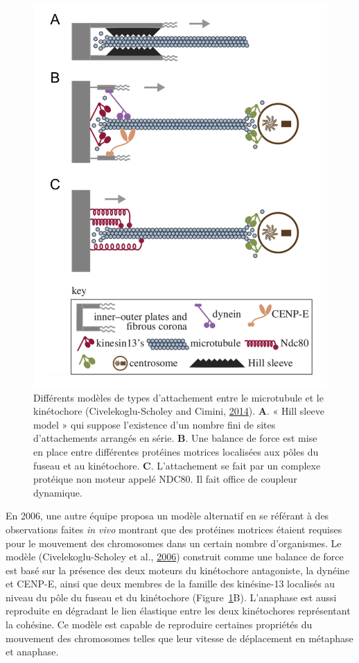 \documentclass[12pt,a4paper,twoside,openright]{book}
\begin{document}
\begin{figure}[htbp]
\centering
\includegraphics{figures/intro/hill_model.png}
\caption[Différents modèles de types d'attachement entre le microtubule et le kinétochore]{\label{fig:hill_model}Différents
modèles de types d'attachement entre le microtubule et le kinétochore
(Civelekoglu-Scholey and Cimini,
\hyperref[ref-Civelekoglu-Scholey2014]{2014}). \textbf{A}. « Hill sleeve
model » qui suppose l'existence d'un nombre fini de sites d'attachements
arrangés en série. \textbf{B}. Une balance de force est mise en place
entre différentes protéines motrices localisées aux pôles du fuseau et
au kinétochore. \textbf{C}. L'attachement se fait par un complexe
protéique non moteur appelé NDC80. Il fait office de coupleur
dynamique.}
\end{figure}

En 2006, une autre équipe proposa un modèle alternatif en se référant à
des observations faites \emph{in vivo} montrant que des protéines
motrices étaient requises pour le mouvement des chromosomes dans un
certain nombre d'organismes. Le modèle (Civelekoglu-Scholey et al.,
\hyperref[ref-Civelekoglu-Scholey2006]{2006}) construit comme une
balance de force est basé sur la présence des deux moteurs du
kinétochore antagoniste, la dynéine et CENP-E, ainsi que deux membres de
la famille des kinésine-13 localisés au niveau du pôle du fuseau et du
kinétochore (Figure~\ref{fig:hill_model}B). L'anaphase est aussi
reproduite en dégradant le lien élastique entre les deux kinétochores
représentant la cohésine. Ce modèle est capable de reproduire certaines
propriétés du mouvement des chromosomes telles que leur vitesse de
déplacement en métaphase et anaphase.
\end{document}
